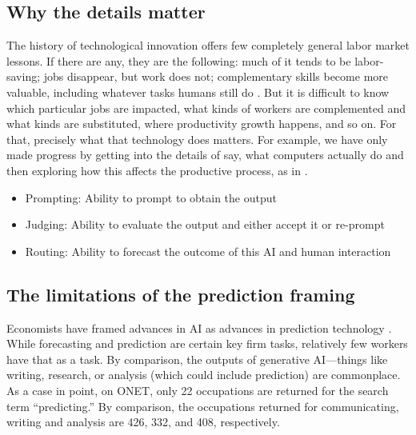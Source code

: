 \documentclass{article}
\begin{document}
\subsection{Why the details matter}
The history of technological innovation offers few completely general labor market lessons.
If there are any, they are the following: much of it tends to be labor-saving; jobs disappear, but work does not; complementary skills become more valuable, including whatever tasks humans still do \citep{autor2015there}. 
But it is difficult to know which particular jobs are impacted, what kinds of workers are complemented and what kinds are substituted, where productivity growth happens, and so on. 
For that, precisely what that technology does matters. 
For example, we have only made progress by getting into the details of say, what computers actually do and then exploring how this affects the productive process, as in \citep{autor2003skill}. 

\begin{itemize}
    \item Prompting: Ability to prompt to obtain the output
    \item Judging: Ability to evaluate the output and either accept it or re-prompt
    \item Routing: Ability to forecast the outcome of this AI and human interaction
\end{itemize}

\subsection{The limitations of the prediction framing}
Economists have framed advances in AI as advances in prediction technology \citep{agrawal2019}.
While forecasting and prediction are certain key firm tasks, relatively few workers have that as a task. 
By comparison, the outputs of generative AI---things like writing, research, or analysis (which could include prediction) are commonplace. 
As a case in point, on ONET, only 22 occupations are returned for the search term ``predicting.'' 
By comparison, the occupations returned for communicating, writing and analysis are 426, 332, and 408, respectively. 



\end{document}
